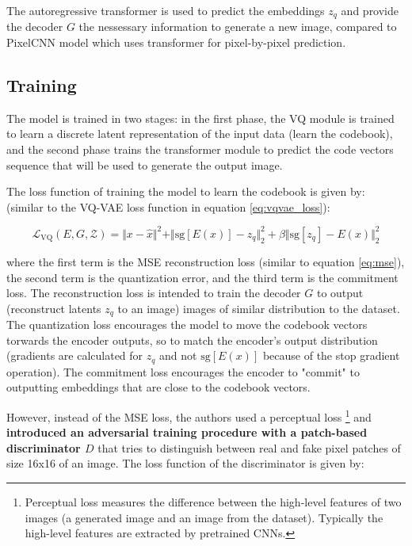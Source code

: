 The autoregressive transformer is used to predict the embeddings $z_q$ and provide the decoder $G$ the nessessary information to generate a new image, compared to PixelCNN model \cite{pixelcnn} which uses transformer for pixel-by-pixel prediction.




\subsection{Training}

The model is trained in two stages: in the first phase, the VQ module is trained to learn a discrete latent representation of the input data (learn the codebook), and the second phase trains the transformer module to predict the code vectors sequence that will be used to generate the output image.

The loss function of training the model to learn the codebook is given by: (similar to the VQ-VAE loss function in equation \ref{eq:vqvae_loss}):

\begin{equation}
    \mathcal{L}_{\text{VQ}} (E, G, \mathcal{Z}) = \Vert x - \hat{x} \Vert ^2 + \Vert \text{sg}[E(x)] - z_q \Vert ^2_2 +  \beta \Vert \text{sg}[z_q] - E(x) \Vert ^2_2
\end{equation}

where the first term is the MSE reconstruction loss (similar to equation \ref{eq:mse}), the second term is the quantization error, and the third term is the commitment loss. The reconstruction loss is intended to train the decoder $G$ to output (reconstruct latents $z_q$ to an image) images of similar distribution to the dataset. The quantization loss encourages the model to move the codebook vectors torwards the encoder outputs, so to match the encoder's output distribution (gradients are calculated for $z_q$ and not $\text{sg}[E(x)]$ because of the stop gradient operation). The commitment loss encourages the encoder to "commit" to outputting embeddings that are close to the codebook vectors.

However, instead of the MSE loss, the authors used a perceptual loss \footnote[4]{Perceptual loss measures the difference between the high-level features of two images (a generated image and an image from the dataset). Typically the high-level features are extracted by pretrained CNNs.} and \textbf{introduced an adversarial training procedure with a patch-based discriminator $D$} that tries to distinguish between real and fake pixel patches of size 16x16 of an image. The loss function of the discriminator is given by:

